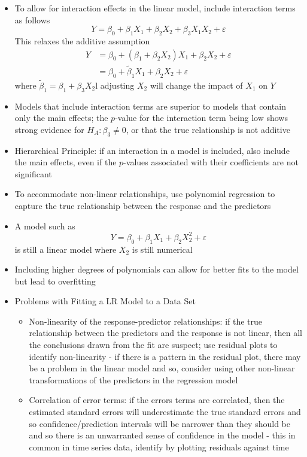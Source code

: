 \documentclass[12pt]{article}
\begin{document}
\begin{itemize}
\item To allow for interaction effects in the linear model, include interaction terms as follows
$$ Y = \beta_0 + \beta_1X_1 + \beta_2X_2 + \beta_3X_1X_2 + \varepsilon $$ 
This relaxes the additive assumption 
$$ \begin{aligned} 
Y &= \beta_0 + (\beta_1 + \beta_2X_2)X_1 + \beta_2X_2 + \varepsilon \\ &= \beta_0 + \tilde{\beta}_1X_1 + \beta_2X_2 + \varepsilon \end{aligned} $$ 
where $\tilde{\beta}_1 = \beta_1 + \beta_3X_2$l adjusting $X_2$ will change the impact of $X_1$ on $Y$
\item Models that include interaction terms are superior to models that contain only the main effects; the $p$-value for the interaction term being low shows strong evidence for $H_A: \beta_3 \neq 0$, or that the true relationship is not additive 
\item Hierarchical Principle: if an interaction in a model is included, also include the main effects, even if the $p$-values associated with their coefficients are not significant 
\item To accommodate non-linear relationships, use polynomial regression to capture the true relationship between the response and the predictors 
\item A model such as $$ Y = \beta_0 + \beta_1X_1 + \beta_2X_2^2 + \varepsilon $$ is still a linear model where $X_2$ is still numerical 
\item Including higher degrees of polynomials can allow for better fits to the model but lead to overfitting
\item Problems with Fitting a LR Model to a Data Set \begin{itemize} 
\item Non-linearity of the response-predictor relationships: if the true relationship between the predictors and the response is not linear, then all the conclusions drawn from the fit are suspect; use residual plots to identify non-linearity - if there is a pattern in the residual plot, there may be a problem in the linear model and so, consider using other non-linear transformations of the predictors in the regression model
\item Correlation of error terms: if the errors terms are correlated, then the estimated standard errors will underestimate the true standard errors and so confidence/prediction intervals will be narrower than they should be and so there is an unwarranted sense of confidence in the model - this in common in time series data, identify by plotting residuals against time 

\end{itemize}
\end{itemize}
\end{document}
